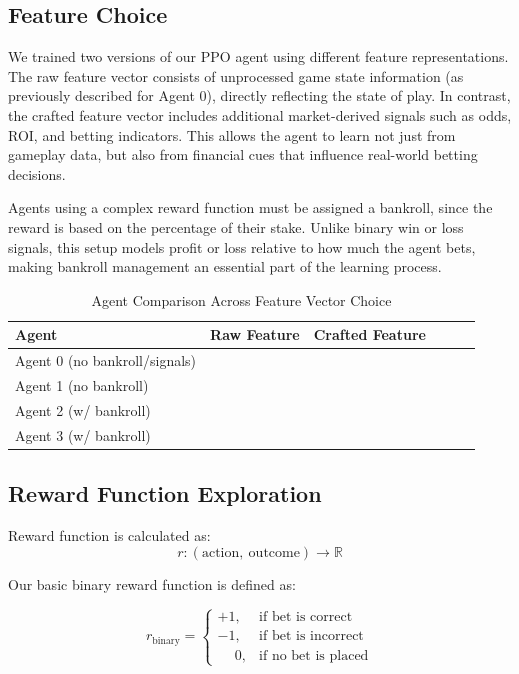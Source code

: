 \documentclass[sigconf]{acmart}
\newcommand{\cmark}{\ding{51}}  %
\begin{document}
\subsection{Feature Choice}

We trained two versions of our PPO agent using different feature representations. The raw feature vector consists of unprocessed game state information (as previously described for Agent 0), directly reflecting the state of play. In contrast, the crafted feature vector includes additional market-derived signals such as odds, ROI, and betting indicators. This allows the agent to learn not just from gameplay data, but also from financial cues that influence real-world betting decisions.

Agents using a complex reward function must be assigned a bankroll, since the reward is based on the percentage of their stake. Unlike binary win or loss signals, this setup models profit or loss relative to how much the agent bets, making bankroll management an essential part of the learning process.

\begin{table}[h]
  \caption{Agent Comparison Across Feature Vector Choice}
  \label{tab:agent_benchmarks}
  \begin{tabular}{lccccc}
    \toprule
    \textbf{Agent} & \textbf{Raw Feature} & \textbf{Crafted Feature} \\
    \midrule
    Agent 0 (no bankroll/signals)     & \cmark  &        \\
    Agent 1 (no bankroll)     & \cmark  &        \\
    Agent 2 (w/ bankroll)   &         & \cmark \\
    Agent 3 (w/ bankroll)   &         & \cmark \\
    \bottomrule
  \end{tabular}
\end{table}

\subsection{Reward Function Exploration}

Reward function is calculated as:
\[
r: (\text{action},\ \text{outcome}) \rightarrow \mathbb{R}
\]

Our basic binary reward function is defined as:

\begin{equation}
r_{\text{binary}} =
\begin{cases}
+1, & \text{if bet is correct} \\
-1, & \text{if bet is incorrect} \\
\phantom{+}0, & \text{if no bet is placed}
\end{cases}
\end{equation}
\end{document}
